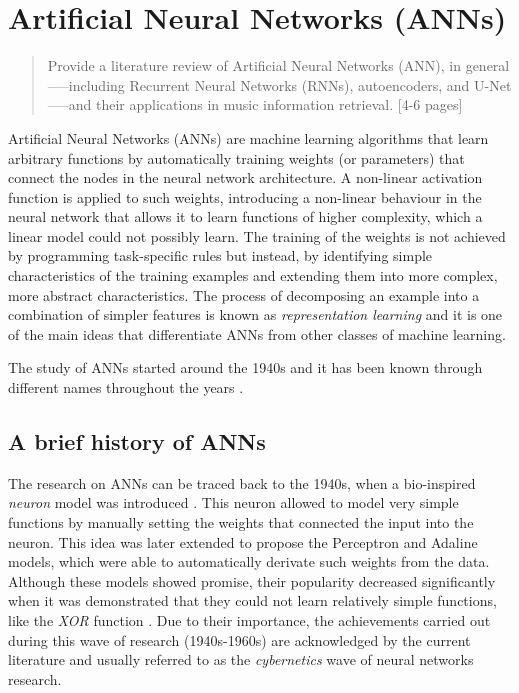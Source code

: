 \chapter{Artificial Neural Networks (ANNs)}
\label{chap:chap20}

\begin{quote}
    Provide a literature review of Artificial Neural Networks (ANN), in general—--including Recurrent Neural Networks (RNNs), autoencoders, and U-Net—--and their applications in music information retrieval. [4-6 pages]
\end{quote}
\clearpage

Artificial Neural Networks (ANNs) are machine learning algorithms that learn arbitrary functions by automatically training weights (or parameters) that connect the nodes in the neural network architecture. A non-linear activation function is applied to such weights, introducing a non-linear behaviour in the neural network that allows it to learn functions of higher complexity, which a linear model could not possibly learn. The training of the weights is not achieved by programming task-specific rules but instead, by identifying simple characteristics of the training examples and extending them into more complex, more abstract characteristics. The process of decomposing an example into a combination of simpler features is known as \emph{representation learning} and it is one of the main ideas that differentiate ANNs from other classes of machine learning. 

The study of ANNs started around the 1940s and it has been known through different names throughout the years \cite{goodfellow_deep_2016}.

\section{A brief history of ANNs}

The research on ANNs can be traced back to the 1940s, when a bio-inspired \emph{neuron} model was introduced \cite{mcculloch_logical_1943}. This neuron allowed to model very simple functions by manually setting the weights that connected the input into the neuron. This idea was later extended to propose the Perceptron \cite{rosenblatt_perceptron:_1958} and Adaline \cite{widrow_adaptive_1960} models, which were able to automatically derivate such weights from the data. Although these models showed promise, their popularity decreased significantly when it was demonstrated that they could not learn relatively simple functions, like the \emph{XOR} function \cite{minsky_perceptrons:_1972}. Due to their importance, the achievements carried out during this wave of research (1940s-1960s) are acknowledged by the current literature \cite{goodfellow_deep_2016} and usually referred to as the \emph{cybernetics} wave of neural networks research.

